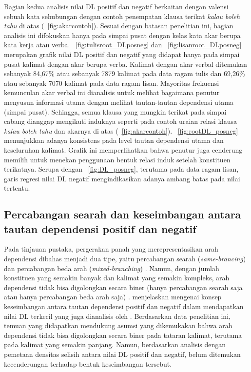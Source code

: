 Bagian kedua analisis nilai DL positif dan negatif berkaitan dengan valensi sebuah kata sehubungan dengan contoh penempatan klausa terikat \textit{kalau boleh tahu} di atas (\pic~\ref{fig:akarcontoh}). Sesuai dengan batasan penelitian ini, bagian analisis ini difokuskan hanya pada simpai pusat dengan kelas kata akar berupa kata kerja atau verba. \pic~\ref{fig:tulisroot_DLposneg} dan \pic~\ref{fig:lisanroot_DLposneg} merupakan grafik nilai DL positif dan negatif yang didapat hanya pada simpai pusat kalimat dengan akar berupa verba. Kalimat dengan akar verbal ditemukan sebanyak 84,67\% atau sebanyak 7879 kalimat pada data ragam tulis dan 69,26\% atau sebanyak 7070 kalimat pada data ragam lisan. Mayoritas frekuensi kemunculan akar verbal ini dianalisis untuk melihat bagaimana penutur menyusun informasi utama dengan melihat tautan-tautan dependensi utama (simpai pusat). Sehingga, semua klausa yang mungkin terikat pada simpai cabang dianggap mengikuti induknya seperti pada contoh uraian relasi klausa \textit{kalau boleh tahu} dan akarnya di atas (\pic~\ref{fig:akarcontoh}). \pic~\ref{fig:rootDL_posneg} menunjukkan adanya konsistens pada level tautan dependensi utama dan keseluruhan kalimat. Grafik ini memperlihatkan bahwa penutur juga cenderung memilih untuk menekan penggunaan bentuk relasi induk setelah konstituen terikatnya. Serupa dengan \pic~\ref{fig:DL_posneg}, terutama pada data ragam lisan, garis regresi nilai DL negatif mengindikasikan adanya ambang batas pada nilai tertentu. 	

\subsection{Percabangan searah dan keseimbangan antara tautan dependensi positif dan negatif}
Pada tinjauan pustaka, pergerakan panah yang merepresentasikan arah dependensi dibahas menjadi dua tipe, yaitu percabangan searah (\textit{same-brancing}) dan percabangan beda arah (\textit{mixed-branching}) \citep{hawkins1994performance}. Namun, dengan jumlah konstituen yang semakin banyak dan kalimat yang semakin kompleks, arah dependensi tidak bisa digolongkan secara biner (hanya percabangan searah saja atau hanya percabangan beda arah saja) \citealp{dryer1992greenbergian, temperley2008dependency}. \cite{gildea2010grammars} menjelaskan mengenai konsep keseimbangan antara tautan dependensi positif dan negatif dalam mendapatkan nilai DL terkecil yang juga dianalisis oleh \citep{dryer1992greenbergian}. Berdasarkan data penelitian ini, temuan yang didapatkan mendukung asumsi yang dikemukakan \cite{dryer1992greenbergian} bahwa arah dependensi tidak bisa digolongkan secara biner pada tataran kalimat, terutama pada kalimat yang semakin panjang. Namun, berdasarkan analisis dengan pemetaan densitas selisih antara nilai DL positif dan negatif, belum ditemukan kecenderungan terhadap bentuk keseimbangan tersebut. 

